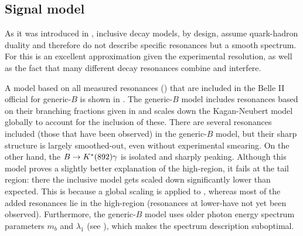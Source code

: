 \subsection{Signal model}\label{sec:signal_model}

As it was introduced in , inclusive decay models, by design, assume quark-hadron duality and therefore do not describe specific resonances but a smooth spectrum.
For \BtoXsgamma this is an excellent approximation given the experimental resolution, as well as the fact that many different decay resonances combine and interfere.

A model based on all measured resonances () that are included in the Belle II official \MC for generic-$B$ is shown in .
The generic-$B$ model includes resonances based on their branching fractions given in  and scales down the Kagan-Neubert model globally to account for the inclusion of these.
There are several resonances included (those that have been observed) in the generic-$B$ model, but their sharp structure is largely smoothed-out, even without experimental smearing.
On the other hand, the $B\rightarrow K^*(892)\gamma$ is isolated and sharply peaking.
Although this model proves a slightly better explanation of the high-\EB region, it fails at the tail region: there the inclusive model gets scaled down significantly lower than expected.
This is because a global scaling is applied to \BtoXsgamma, whereas most of the added resonances lie in the high-\EB region (resonances at lower-\EB have not yet been observed).
Furthermore, the generic-$B$ model uses older \BtoXsgamma photon energy spectrum parameters $m_b$ and $\lambda_1$ (see ), which makes the spectrum description suboptimal.

